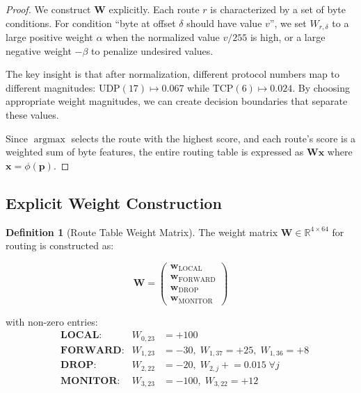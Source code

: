 \documentclass[11pt,a4paper,twoside]{article}
\theoremstyle{definition}
\newtheorem{definition}{Definition}[section]
\theoremstyle{remark}
\newcommand{\R}{\mathbb{R}}
\newcommand{\argmax}{\operatorname{argmax}}
\newcommand{\mat}[1]{\mathbf{#1}}
\newcommand{\vect}[1]{\mathbf{#1}}
\begin{document}
\begin{proof}
We construct $\mat{W}$ explicitly. Each route $r$ is characterized by a set of byte conditions. For condition ``byte at offset $\delta$ should have value $v$'', we set $W_{r,\delta}$ to a large positive weight $\alpha$ when the normalized value $v/255$ is high, or a large negative weight $-\beta$ to penalize undesired values.

The key insight is that after normalization, different protocol numbers map to different magnitudes: $\text{UDP}(17) \mapsto 0.067$ while $\text{TCP}(6) \mapsto 0.024$. By choosing appropriate weight magnitudes, we can create decision boundaries that separate these values.

Since $\argmax$ selects the route with the highest score, and each route's score is a weighted sum of byte features, the entire routing table is expressed as $\mat{W}\vect{x}$ where $\vect{x} = \phi(\vect{p})$.
\end{proof}

\subsection{Explicit Weight Construction}

\begin{definition}[Route Table Weight Matrix]
\label{def:route-weights}
The weight matrix $\mat{W} \in \R^{4 \times 64}$ for routing is constructed as:

\begin{equation}
\mat{W} = \begin{pmatrix}
\vect{w}_{\text{LOCAL}} \\
\vect{w}_{\text{FORWARD}} \\
\vect{w}_{\text{DROP}} \\
\vect{w}_{\text{MONITOR}}
\end{pmatrix}
\end{equation}

with non-zero entries:
\begin{align}
&\textbf{LOCAL}:      & W_{0,23} &= +100 \label{eq:local}\\
&\textbf{FORWARD}:    & W_{1,23} &= -30, \; W_{1,37} = +25, \; W_{1,36} = +8 \label{eq:forward}\\
&\textbf{DROP}:       & W_{2,22} &= -20, \; W_{2,j} \mathrel{+}= 0.015 \;\forall j \label{eq:drop}\\
&\textbf{MONITOR}:    & W_{3,23} &= -100, \; W_{3,22} = +12 \label{eq:monitor}
\end{align}
\end{definition}
\end{document}
